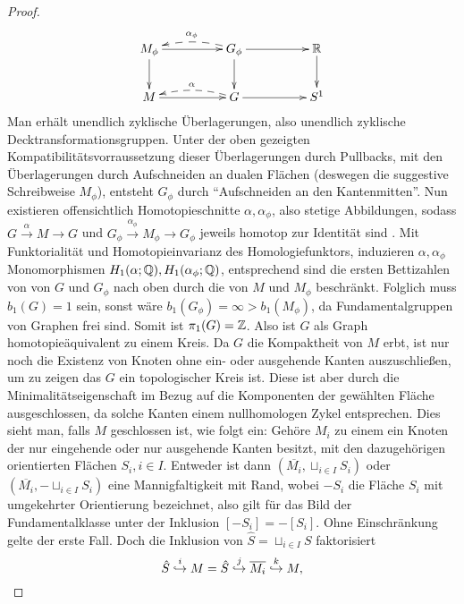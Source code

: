 \begin{proof}
	\[
	 	\begin{xy}
	 		\xymatrixcolsep{4pc}\xymatrix{
	 			M_\phi \ar[r] \ar[d] & G_\phi \ar[d] \ar@{-->}@/_/[l]_{\alpha_\phi} \ar[r] & \RR \ar[d]\\
	 			M \ar[r] & G \ar@{-->}@/_/[l]_\alpha \ar[r] &S^1
	 		}
	 	\end{xy}
	 \] 
	 Man erhält unendlich zyklische Überlagerungen, also unendlich zyklische Decktransformationsgruppen. Unter der oben gezeigten Kompatibilitätsvorraussetzung dieser Überlagerungen durch Pullbacks, mit den Überlagerungen durch Aufschneiden an dualen Flächen (deswegen die suggestive Schreibweise $M_\phi$), entsteht $G_\phi$ durch "`Aufschneiden an den Kantenmitten"'. Nun existieren offensichtlich Homotopieschnitte $\alpha, \alpha_\phi$, also stetige Abbildungen, sodass $ G \stackrel \alpha \to M \to G$ und $ G_\phi \stackrel {\alpha_ \phi} \to M_\phi \to G_\phi$ jeweils homotop zur Identität sind . Mit Funktorialität und Homotopieinvarianz des Homologiefunktors, induzieren $\alpha,\alpha_\phi$ Monomorphismen $H_1(\alpha;\mathbb{Q}),H_1(\alpha_\phi;\mathbb{Q})$, entsprechend sind die ersten Bettizahlen von von $G$ und $G_\phi$ nach oben durch die von $M$ und $M_\phi$ beschränkt. Folglich muss $b_1(G)=1$ sein, sonst wäre $b_1(G_\phi)=\infty> b_1(M_\phi)$, da Fundamentalgruppen von Graphen frei sind. Somit ist $\pi_1(G)= \mathbb{Z}$. Also ist $G$ als Graph homotopieäquivalent zu einem Kreis. Da $G$ die Kompaktheit von $M$ erbt, ist nur noch die Existenz von Knoten ohne ein- oder ausgehende Kanten auszuschließen, um zu zeigen das $G$ ein topologischer Kreis ist. Diese ist aber durch die Minimalitätseigenschaft im Bezug auf die Komponenten der gewählten Fläche ausgeschlossen, da solche Kanten einem nullhomologen Zykel entsprechen. Dies sieht man, falls $M$ geschlossen ist, wie folgt ein: Gehöre $M_i$ zu einem ein Knoten der nur eingehende oder nur ausgehende Kanten besitzt, mit den dazugehörigen orientierten Flächen $S_i, i \in I$. Entweder ist dann $(\overline{M_i},\sqcup_{i\in I}S_i)$ oder $(\overline{M_i},-\sqcup_{i\in I}S_i)$ eine Mannigfaltigkeit mit Rand, wobei $-S_i$ die Fläche $S_i$ mit umgekehrter Orientierung bezeichnet, also gilt für das Bild der Fundamentalklasse unter der Inklusion $[-S_i]=-[S_i]$. Ohne Einschränkung gelte der erste Fall. Doch die Inklusion von $\hat S = \sqcup_{i \in I} S$ faktorisiert 
	 \[
	  \hat S \stackrel i {\hookrightarrow} M = \hat S \stackrel j {\hookrightarrow} \overline{M_i} \stackrel k {\hookrightarrow} M,	 	
	 \]

\end{proof}
